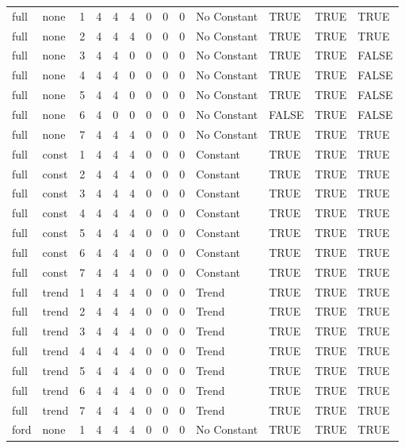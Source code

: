 \begin{longtable}[t]{llrrrrrrrllll}
\endfoot
\bottomrule
\endlastfoot
full & none & 1 & 4 & 4 & 4 & 0 & 0 & 0 & No Constant & TRUE & TRUE & TRUE\\
full & none & 2 & 4 & 4 & 4 & 0 & 0 & 0 & No Constant & TRUE & TRUE & TRUE\\
full & none & 3 & 4 & 4 & 0 & 0 & 0 & 0 & No Constant & TRUE & TRUE & FALSE\\
full & none & 4 & 4 & 4 & 0 & 0 & 0 & 0 & No Constant & TRUE & TRUE & FALSE\\
full & none & 5 & 4 & 4 & 0 & 0 & 0 & 0 & No Constant & TRUE & TRUE & FALSE\\
\addlinespace
full & none & 6 & 4 & 0 & 0 & 0 & 0 & 0 & No Constant & FALSE & TRUE & FALSE\\
full & none & 7 & 4 & 4 & 4 & 0 & 0 & 0 & No Constant & TRUE & TRUE & TRUE\\
full & const & 1 & 4 & 4 & 4 & 0 & 0 & 0 & Constant & TRUE & TRUE & TRUE\\
full & const & 2 & 4 & 4 & 4 & 0 & 0 & 0 & Constant & TRUE & TRUE & TRUE\\
full & const & 3 & 4 & 4 & 4 & 0 & 0 & 0 & Constant & TRUE & TRUE & TRUE\\
\addlinespace
full & const & 4 & 4 & 4 & 4 & 0 & 0 & 0 & Constant & TRUE & TRUE & TRUE\\
full & const & 5 & 4 & 4 & 4 & 0 & 0 & 0 & Constant & TRUE & TRUE & TRUE\\
full & const & 6 & 4 & 4 & 4 & 0 & 0 & 0 & Constant & TRUE & TRUE & TRUE\\
full & const & 7 & 4 & 4 & 4 & 0 & 0 & 0 & Constant & TRUE & TRUE & TRUE\\
full & trend & 1 & 4 & 4 & 4 & 0 & 0 & 0 & Trend & TRUE & TRUE & TRUE\\
\addlinespace
full & trend & 2 & 4 & 4 & 4 & 0 & 0 & 0 & Trend & TRUE & TRUE & TRUE\\
full & trend & 3 & 4 & 4 & 4 & 0 & 0 & 0 & Trend & TRUE & TRUE & TRUE\\
full & trend & 4 & 4 & 4 & 4 & 0 & 0 & 0 & Trend & TRUE & TRUE & TRUE\\
full & trend & 5 & 4 & 4 & 4 & 0 & 0 & 0 & Trend & TRUE & TRUE & TRUE\\
full & trend & 6 & 4 & 4 & 4 & 0 & 0 & 0 & Trend & TRUE & TRUE & TRUE\\
\addlinespace
full & trend & 7 & 4 & 4 & 4 & 0 & 0 & 0 & Trend & TRUE & TRUE & TRUE\\
ford & none & 1 & 4 & 4 & 4 & 0 & 0 & 0 & No Constant & TRUE & TRUE & TRUE\\

\end{longtable}

